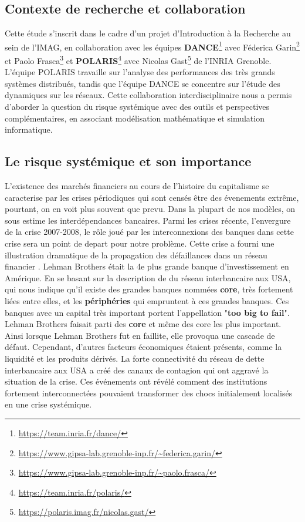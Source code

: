 \subsection{Contexte de recherche et collaboration}
Cette étude s'inscrit dans le cadre d'un projet d'Introduction à la Recherche au sein de l'IMAG,
en collaboration avec les équipes \textbf{DANCE}\footnote{\url{https://team.inria.fr/dance/}}
avec Féderica Garin\footnote{\url{https://www.gipsa-lab.grenoble-inp.fr/~federica.garin/}} et
Paolo Frasca\footnote{\url{https://www.gipsa-lab.grenoble-inp.fr/~paolo.frasca/}} et
\textbf{POLARIS}\footnote{\url{https://team.inria.fr/polaris/}} avec Nicolas Gast\footnote{\url{https://polaris.imag.fr/nicolas.gast/}}
de l'INRIA Grenoble.
L'équipe POLARIS travaille sur l'analyse des performances des très grands systèmes distribués,
tandis que l'équipe DANCE se concentre sur l'étude des dynamiques sur les réseaux.
Cette collaboration interdisciplinaire nous a permis d'aborder la question du risque systémique avec des outils et perspectives complémentaires,
en associant modélisation mathématique et simulation informatique.

\subsection{Le risque systémique et son importance}
L'existence des marchés financiers au cours de l'histoire du capitalisme se caracterise par les crises périodiques qui sont censés être des évenements extrême,
pourtant, on en voit plus souvent que prevu. Dans la plupart de nos modèles, on sous estime les interdépendances bancaires. Parmi les crises récente, l'envergure de la crise 2007-2008, le rôle joué par les interconnexions des banques dans cette crise sera un point de depart pour notre
problème.
Cette crise a fourni une illustration dramatique de la propagation des défaillances
dans un réseau financier \cite{peyton2016contagion}. Lehman Brothers était la 4e plus grande banque
d'investissement en Amérique. En se basant sur la description de \cite{jglass2006topologyus} du réseau
interbancaire aux USA, qui nous indique qu'il existe des grandes banques nommées \textbf{core},
très fortement liées entre elles, et les \textbf{périphéries} qui empruntent à ces grandes banques.
Ces banques avec un capital très important portent l'appellation "\textbf{too big to fail}".
Lehman Brothers faisait parti des \textbf{core} et même des core les plus important.
Ainsi lorsque Lehman Brothers fut en faillite, elle provoqua une cascade de défaut. Cependant,
d'autres facteurs économiques étaient présents, comme la liquidité et les produits dérivés.
La forte connectivité du réseau de dette interbancaire aux USA a créé des canaux de contagion qui ont
aggravé la situation de la crise. Ces événements ont révélé comment des institutions fortement
interconnectées pouvaient transformer des chocs initialement localisés en une crise systémique.



